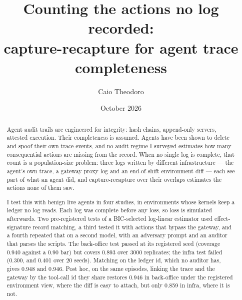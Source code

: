 \documentclass[11pt]{article}
\title{Counting the actions no log recorded:\\capture-recapture for agent trace completeness}
\author{Caio Theodoro}
\date{October 2026}
\begin{document}
\maketitle

\begin{abstract}
Agent audit trails are engineered for integrity: hash chains, append-only
servers, attested execution. Their completeness is assumed. Agents have been
shown to delete and spoof their own trace events, and no audit regime I surveyed
estimates how many consequential actions are missing from the record. When no
single log is complete, that count is a population-size problem: three logs
written by different infrastructure --- the agent's own trace, a gateway proxy
log and an end-of-shift environment diff --- each see part of what an agent did,
and capture-recapture over their overlaps estimates the actions none of them saw.

I test this with benign live agents in four studies, in environments whose kernels keep a
ledger no log reads. Each log was complete before any loss, so loss is simulated
afterwards. Two pre-registered tests of a BIC-selected log-linear estimator used
effect-signature record matching, a third tested it with actions that bypass the gateway, and
a fourth repeated that on a second model, with an adversary prompt and an auditor that parses
the scripts. The back-office test passed at its registered
seed (coverage 0.940 against a 0.90 bar) but covers 0.893 over 3000 replicates;
the infra test failed (0.300, and 0.401 over 20 seeds). Matching on the ledger
id, which no auditor has, gives 0.948 and 0.946. Post hoc, on the same episodes,
linking the trace and the gateway by the tool-call id they share restores 0.946
in back-office under the registered environment view, where the diff is easy to
attach, but only 0.859 in infra, where it is not.


\end{abstract}
\end{document}
